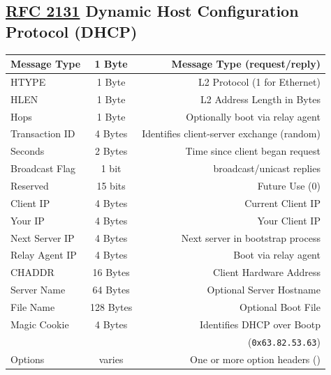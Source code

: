 \documentclass[12pt]{article}
\newcommand{\RFC}[1]{\href{https://datatracker.ietf.org/doc/html/rfc#1}{RFC #1}}
\begin{document}
	\subsection[RFC 2131 DHCP]{\RFC{2131} Dynamic Host Configuration Protocol (DHCP) \label{subsec:DHCP}}
	\begin{table}[H]
	\centering
	\begin{tabular}{| l | c | r |}\hline
	Message Type		& 1 Byte	& Message Type (request/reply)\\\hline
	HTYPE			& 1 Byte	& L2 Protocol (1 for Ethernet)\\\hline
	HLEN				& 1 Byte	& L2 Address Length in Bytes\\\hline
	Hops				& 1 Byte	& Optionally boot via relay agent\\\hline
	Transaction ID		& 4 Bytes	& Identifies client-server exchange (random)\\\hline
	Seconds			& 2 Bytes	& Time since client began request\\\hline
	Broadcast Flag		& 1 bit 	& broadcast/unicast replies\\\hline
	Reserved			& 15 bits	& Future Use (0)\\\hline
	Client IP			& 4 Bytes	& Current Client IP\\\hline
	Your IP			& 4 Bytes	& Your Client IP\\\hline
	Next Server IP		& 4 Bytes	& Next server in bootstrap process\\\hline
	Relay Agent IP		& 4 Bytes	& Boot via relay agent\\\hline
	CHADDR			& 16 Bytes	& Client Hardware Address\\\hline
	Server Name		& 64 Bytes	& Optional Server Hostname\\\hline
	File Name			& 128 Bytes	& Optional Boot File\\\hline
	Magic Cookie		& 4 Bytes	& Identifies DHCP over Bootp\\
					&		& (\texttt{0x63.82.53.63})\\\hline
	Options			& varies	& One or more option headers (\Cref{tab:DHCP OPTIONS})\\\hline
	\end{tabular}\end{table}
\end{document}
